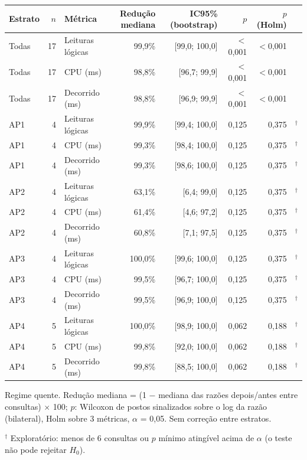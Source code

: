 {\small\setlength{\tabcolsep}{4pt}
\begin{tabular}{lrlrrrrl}
\toprule
Estrato & $n$ & Métrica & Redução mediana & IC95\% (bootstrap) & $p$ & $p$ (Holm) &  \\
\midrule
Todas & 17 & Leituras lógicas & 99,9\% & [99,0; 100,0] & $<$0,001 & $<$0,001 &  \\
Todas & 17 & CPU (ms) & 98,8\% & [96,7; 99,9] & $<$0,001 & $<$0,001 &  \\
Todas & 17 & Decorrido (ms) & 98,8\% & [96,9; 99,9] & $<$0,001 & $<$0,001 &  \\
\midrule
AP1 & 4 & Leituras lógicas & 99,9\% & [99,4; 100,0] & 0,125 & 0,375 & $^{\dagger}$ \\
AP1 & 4 & CPU (ms) & 99,3\% & [98,4; 100,0] & 0,125 & 0,375 & $^{\dagger}$ \\
AP1 & 4 & Decorrido (ms) & 99,3\% & [98,6; 100,0] & 0,125 & 0,375 & $^{\dagger}$ \\
\midrule
AP2 & 4 & Leituras lógicas & 63,1\% & [6,4; 99,0] & 0,125 & 0,375 & $^{\dagger}$ \\
AP2 & 4 & CPU (ms) & 61,4\% & [4,6; 97,2] & 0,125 & 0,375 & $^{\dagger}$ \\
AP2 & 4 & Decorrido (ms) & 60,8\% & [7,1; 97,5] & 0,125 & 0,375 & $^{\dagger}$ \\
\midrule
AP3 & 4 & Leituras lógicas & 100,0\% & [99,6; 100,0] & 0,125 & 0,375 & $^{\dagger}$ \\
AP3 & 4 & CPU (ms) & 99,5\% & [96,7; 100,0] & 0,125 & 0,375 & $^{\dagger}$ \\
AP3 & 4 & Decorrido (ms) & 99,5\% & [96,9; 100,0] & 0,125 & 0,375 & $^{\dagger}$ \\
\midrule
AP4 & 5 & Leituras lógicas & 100,0\% & [98,9; 100,0] & 0,062 & 0,188 & $^{\dagger}$ \\
AP4 & 5 & CPU (ms) & 99,8\% & [92,0; 100,0] & 0,062 & 0,188 & $^{\dagger}$ \\
AP4 & 5 & Decorrido (ms) & 99,8\% & [88,5; 100,0] & 0,062 & 0,188 & $^{\dagger}$ \\
\bottomrule
\end{tabular}\par
\vspace{3pt}
\begin{minipage}{\linewidth}\footnotesize
Regime quente. Redução mediana = (1 $-$ mediana das razões depois/antes entre consultas) $\times$ 100; $p$: Wilcoxon de postos sinalizados sobre o log da razão (bilateral), Holm sobre 3 métricas, $\alpha$ = 0,05. Sem correção entre estratos.\par
$^{\dagger}$ Exploratório: menos de 6 consultas ou $p$ mínimo atingível acima de $\alpha$ (o teste não pode rejeitar $H_0$).
\end{minipage}
}
